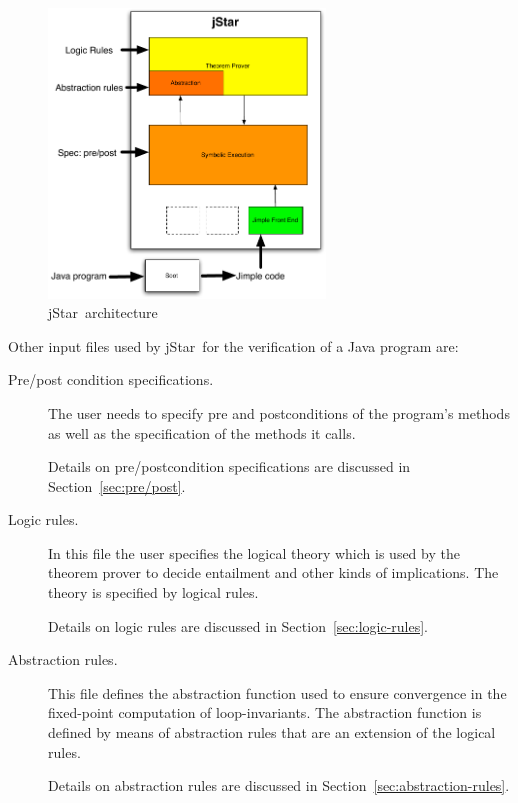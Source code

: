\documentclass[11pt]{article}
\newcommand{\jStar}{{\sf jStar}}
\newcommand{\jStarPlain}{\jStar}
\begin{document}
%
\begin{figure}[t]
  \centering
  \includegraphics[width=2.9in]{architecture2}
  \caption[\jStarPlain\ architecture]{\jStar\ architecture}
  \label{fig:architecture}
\end{figure}
%
Other input files used by \jStar \ for the verification of a Java
program are:
\begin{description}
\item[Pre/post condition specifications.]  The user needs to specify
  pre and postconditions of the program's methods as well as the
  specification of the methods it calls. 

  Details on pre/postcondition specifications are discussed in
  Section~\ref{sec:pre/post}.
\item[Logic rules.]  In this file the user specifies the logical
  theory which is used by the theorem prover to decide entailment
  and other kinds of implications. The theory is specified by logical
  rules.  

  Details on logic rules are discussed in Section~\ref{sec:logic-rules}.
\item[Abstraction rules.]  This file defines the abstraction function
  used to ensure convergence in the fixed-point computation of
  loop-invariants. The abstraction function is defined by means of
  abstraction rules that are an extension of the logical rules. 
  
  Details on abstraction rules are discussed in
  Section~\ref{sec:abstraction-rules}.
\end{description}

\newcommand{\linkedlist}{\texttt{LinkedList.java} }
\end{document}
